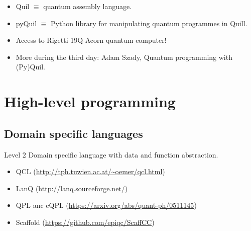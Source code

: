 \documentclass{beamer}
\begin{document}
\begin{frame}{\insertsection}{\insertsubsection}
	\begin{itemize}
        \item<1-> Quil $\equiv$ quantum assembly language.
        \item<2-> pyQuil $\equiv$ Python library for manipulating quantum 
        programmes in Quill.
        \item<3-> Access to Rigetti 19Q-Acorn quantum computer!
        \item<4-> More during the third day: Adam Szady, Quantum programming 
        with (Py)Quil.
    \end{itemize}
\end{frame}


\section{High-level programming}


\subsection{Domain specific languages}

\begin{frame}{\insertsection}{\insertsubsection}

\begin{block}{Level 2}
Domain specific language with data and function abstraction.
\end{block}

\begin{itemize}
    \item QCL (\url{http://tph.tuwien.ac.at/~oemer/qcl.html})
    \item LanQ (\url{http://lanq.sourceforge.net/})
    \item QPL anc cQPL (\url{https://arxiv.org/abs/quant-ph/0511145})
    \item Scaffold (\url{https://github.com/epiqc/ScaffCC})
\end{itemize}
\end{frame}


\end{document}

